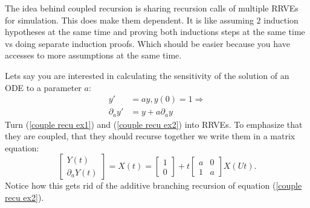 \documentclass[a4paper,12pt]{article}
\begin{document}
\begin{technique}
    The idea behind coupled recursion is sharing recursion calls of
    multiple RRVEs for simulation. This does make them dependent.
    It is like assuming $2$ induction hypotheses at the same
    time and proving both inductions steps at the same time vs
    doing separate induction proofs. Which should be easier
    because you have accesses to more assumptions at the same time.
\end{technique}

\begin{example} \label{ex:coupled recursion}
    Lets say you are interested in calculating the
    sensitivity of the solution of an ODE to a
    parameter $a$:
    \begin{align}
        y'             & =ay,y(0)=1 \Rightarrow \label{couple recu ex1} \\
        \partial_{a}y' & = y + a \partial_{a}y \label{couple recu ex2}
    \end{align}
    Turn (\ref{couple recu ex1}) and (\ref{couple recu ex2}) into RRVEs.
    To emphasize that they are coupled, that they should
    recurse together we write them in a matrix equation:
    \begin{equation} \label{coupled mat}
        \begin{bmatrix}
            Y(t) \\
            \partial_{a}Y(t)
        \end{bmatrix}=
        X(t)=
        \begin{bmatrix}
            1 \\
            0
        \end{bmatrix}+
        t \begin{bmatrix}
            a & 0 \\
            1 & a
        \end{bmatrix}
        X(Ut).
    \end{equation}
    Notice how this gets rid of the additive branching
    recursion of equation (\ref{couple recu ex2}).

\end{example}

\begin{pythonn} 
\end{pythonn}
\end{document}

